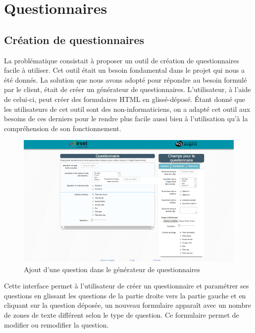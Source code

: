 \section{Questionnaires}

\subsection{Création de questionnaires}
La problématique consistait à proposer un outil de création de questionnaires facile à utiliser. Cet outil était un besoin fondamental dans le projet qui nous a été donnés. La solution que nous avons adopté pour répondre au besoin formulé par le client, était de créer un générateur de questionnaires. L’utilisateur, à l'aide de celui-ci, peut créer des formulaires HTML en glissé-déposé. Étant donné que les utilisateurs de cet outil sont des non-informaticiens, on a adapté cet outil aux besoins de ces derniers pour le rendre plus facile aussi bien à l’utilisation qu'à la compréhension de son fonctionnement.

\begin{figure}[H]
    \begin{center}
	\includegraphics[scale=0.8]{img/questionnaire/generateur}
    \end{center}
    \caption{Ajout d'une question dans le générateur de questionnaires}
\end{figure}



Cette interface permet à l'utilisateur de créer un questionnaire et paramétrer ses questions en glissant les questions de la partie droite vers la partie gauche et en cliquant sur la question déposée, un nouveau formulaire apparaît avec un nombre de zones de texte différent selon le type de question. Ce formulaire permet de modifier ou remodifier la question.


